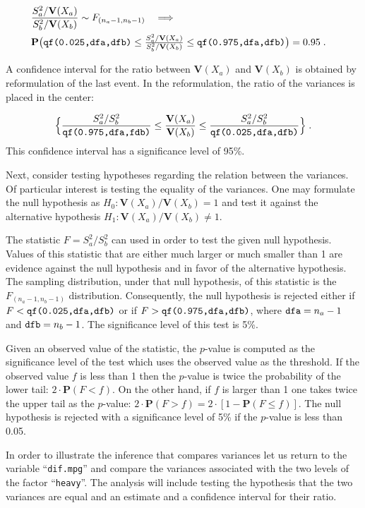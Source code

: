 \documentclass[
]{krantz}
\newcommand{\Prob}{\mathbf{P}}
\newcommand{\Var}{\mathbf{V}}
\theoremstyle{definition}
\theoremstyle{definition}
\theoremstyle{definition}
\theoremstyle{remark}
\begin{document}
\[\begin{aligned}
\lefteqn{\frac{S_a^2/\Var(X_a)}{S_b^2/\Var(X_b)} \sim F_{(n_a-1,n_b-1)} \quad \Longrightarrow }\\ & \Prob \big( \mbox{\texttt{qf(0.025,dfa,dfb)}} \leq  {\textstyle \frac{S_a^2/\Var(X_a)}{S_b^2/\Var(X_b)}}  \leq \mbox{\texttt{qf(0.975,dfa,dfb)}} \big) = 0.95\;.\end{aligned}\]

A confidence interval for the ratio between \(\Var(X_a)\) and \(\Var(X_b)\)
is obtained by reformulation of the last event. In the reformulation,
the ratio of the variances is placed in the center:

\[\Big\{\frac{S_a^2/S_b^2}{\mbox{\texttt{qf(0.975,dfa,fdb)}}} \leq  \frac{\Var(X_a)}{\Var(X_b)}  \leq \frac{S_a^2/S_b^2}{\mbox{\texttt{qf(0.025,dfa,dfb)}}}\Big\}\;.\]
This confidence interval has a significance level of 95\%.

Next, consider testing hypotheses regarding the relation between the
variances. Of particular interest is testing the equality of the
variances. One may formulate the null hypothesis as
\(H_0: \Var(X_a)/\Var(X_b) = 1\) and test it against the alternative
hypothesis \(H_1: \Var(X_a)/\Var(X_b) \not = 1\).

The statistic \(F = S_a^2/S_b^2\) can used in order to test the given null
hypothesis. Values of this statistic that are either much larger or much
smaller than 1 are evidence against the null hypothesis and in favor of
the alternative hypothesis. The sampling distribution, under that null
hypothesis, of this statistic is the \(F_{(n_a-1,n_b-1)}\) distribution.
Consequently, the null hypothesis is rejected either if
\(F < \mbox{\texttt{qf(0.025,dfa,dfb)}}\) or if
\(F >\mbox{\texttt{qf(0.975,dfa,dfb)}}\), where
\(\mbox{\texttt{dfa}} = n_a - 1\) and \(\mbox{\texttt{dfb}} = n_b - 1\). The
significance level of this test is 5\%.

Given an observed value of the statistic, the \(p\)-value is computed as
the significance level of the test which uses the observed value as the
threshold. If the observed value \(f\) is less than 1 then the \(p\)-value
is twice the probability of the lower tail: \(2\cdot \Prob(F < f)\). On
the other hand, if \(f\) is larger than 1 one takes twice the upper tail
as the \(p\)-value: \(2\cdot \Prob(F > f) = 2\cdot [1-\Prob(F \leq f)]\).
The null hypothesis is rejected with a significance level of 5\% if the
\(p\)-value is less than 0.05.

In order to illustrate the inference that compares variances let us
return to the variable ``\texttt{dif.mpg}'' and compare the variances associated
with the two levels of the factor ``\texttt{heavy}''. The analysis will include
testing the hypothesis that the two variances are equal and an estimate
and a confidence interval for their ratio.
\end{document}
